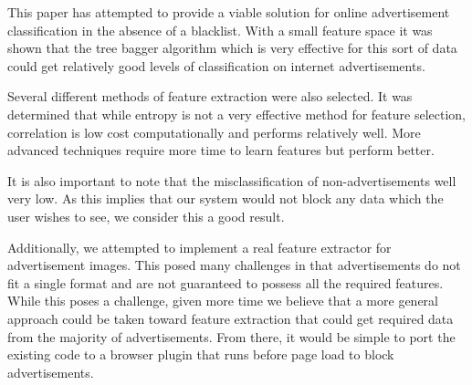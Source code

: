 This paper has attempted to provide a viable solution for online advertisement classification in the absence of a blacklist. With a small feature space it was shown that the tree bagger algorithm which is very effective for this sort of data could get relatively good levels of classification on internet advertisements.

Several different methods of feature extraction were also selected. It was determined that while entropy is not a very effective method for feature selection, correlation is low cost computationally and performs relatively well. More advanced techniques require more time to learn features but perform better. 

It is also important to note that the misclassification of non-advertisements well very low. As this implies that our system would not block any data which the user wishes to see, we consider this a good result.

Additionally, we attempted to implement a real feature extractor for advertisement images. This posed many challenges in that advertisements do not fit a single format and are not guaranteed to possess all the required features. While this poses a challenge, given more time we believe that a more general approach could be taken toward feature extraction that could get required data from the majority of advertisements. From there, it would be simple to port the existing code to a browser plugin that runs before page load to block advertisements. 

